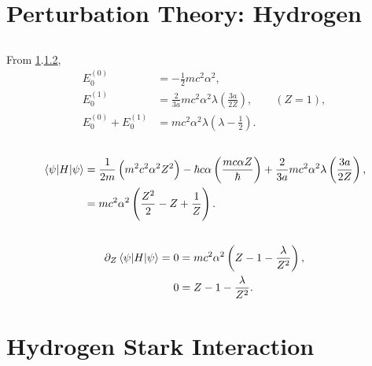 \documentclass[
a4paper,
10pt,
twoside,
]{article}
\begin{document}
{}
\maketitle

\section{Perturbation Theory: Hydrogen}\label{sec: I}
\subsection{}\label{ssec: Ia}

From \ref{sec: I}.\ref{ssec: Ib},
\begin{align}
	E_0^{(0)} &= -\frac{1}{2}mc^2\alpha^2,\\
	E_0^{(1)} &= \frac{2}{3a}mc^2\alpha^2\lambda\left(\frac{3a}{2Z}\right), \qquad (Z=1),\\
	E_0^{(0)}+E_0^{(1)} &= mc^2\alpha^2\lambda\left(\lambda-\frac{1}{2}\right).
\end{align}

\subsection{}\label{ssec: Ib}

\begin{align}
	\ev*{H}{\psi} &= \frac{1}{2m} \left(m^2c^2\alpha^2 Z^2\right) - \hbar c \alpha \left(\frac{mc\alpha Z}{\hbar}\right) + \frac{2}{3a} mc^2\alpha^2\lambda \left(\frac{3a}{2Z}\right),\\
	&= mc^2\alpha^2 \left(\frac{Z^2}{2} - Z + \frac{1}{Z}\right).
\end{align}

\subsection{}\label{ssec: Ic}

\begin{align}
	\partial_Z \ev*{H}{\psi} = 0 &= mc^2\alpha^2 \left(Z - 1 - \frac{\lambda}{Z^2}\right),\\
	0 &= Z - 1 - \frac{\lambda}{Z^2}.
\end{align}

\section{Hydrogen Stark Interaction}\label{sec: II}
\subsection{}\label{ssec: IIa}
\subsection{}\label{ssec: IIb}
\subsection{}\label{ssec: IIc}
\subsection{}\label{ssec: IId}
\subsection{}\label{ssec: IIe}

\end{document}
